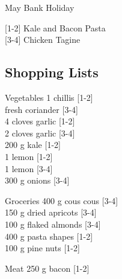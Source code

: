 		\begin{menu}{May Bank Holiday}
    
    \begin{recipelist}
    
        {\scriptsize[1-2]} Kale and Bacon Pasta\\
        {\scriptsize[3-4]} Chicken Tagine\\
    \end{recipelist}%
    \begin{recipelist}
    
    \end{recipelist}\par%
  
    \subsection*{Shopping Lists}
      \begin{shoppinglist}{Vegetables}
      1  chillis 
        {\scriptsize[1-2]}\\
        fresh coriander 
        {\scriptsize[3-4]}\\
      4 cloves garlic 
        {\scriptsize[1-2]}\\
      2 cloves garlic 
        {\scriptsize[3-4]}\\
      200 g kale 
        {\scriptsize[1-2]}\\
      1  lemon 
        {\scriptsize[1-2]}\\
      1  lemon 
        {\scriptsize[3-4]}\\
      300 g onions 
        {\scriptsize[3-4]}\\
      \end{shoppinglist}%
      \begin{shoppinglist}{Groceries}
      400 g cous cous 
        {\scriptsize[3-4]}\\
      150 g dried apricots 
        {\scriptsize[3-4]}\\
      100 g flaked almonds 
        {\scriptsize[3-4]}\\
      400 g pasta shapes 
        {\scriptsize[1-2]}\\
      100 g pine nuts 
        {\scriptsize[1-2]}\\
      \end{shoppinglist}%
      \par\vfil %
      \begin{shoppinglist}{Meat}
      250 g bacon 
        {\scriptsize[1-2]}\\

\end{shoppinglist}
\end{menu}
